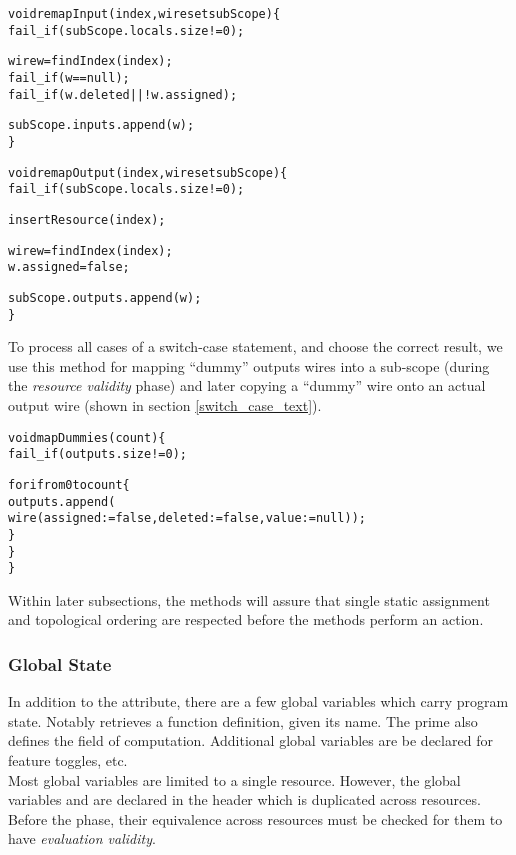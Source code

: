\begin{alltt}\ttSem
  void remapInput(index, wireset subScope) \{
    fail_if(subScope.locals.size != 0);

    wire w = findIndex(index);
    fail_if(w == null);
    fail_if(w.deleted || !w.assigned);
    
    subScope.inputs.append(w);
  \}

  void remapOutput(index, wireset subScope) \{
    fail_if(subScope.locals.size != 0);

    insertResource(index);

    wire w = findIndex(index);
    w.assigned = false;
    
    subScope.outputs.append(w);
  \}

\end{alltt}

To process all cases of a switch-case statement, and choose the correct result, we use this method for mapping ``dummy'' outputs wires into a sub-scope (during the \textit{resource validity} phase) and later copying a ``dummy'' wire onto an actual output wire (shown in section \ref{switch_case_text}).\\

\begin{alltt}\ttSem
  void mapDummies(count) \{
    fail_if(outputs.size != 0);

    for i from 0 to count \{
      outputs.append(
        wire(assigned := false, deleted := false, value := null));
    \}
  \}
\}
\end{alltt}

Within later subsections, the  methods will assure that single static assignment and topological ordering are respected before the  methods perform an action.
\\

\subsubsection{Global State}
In addition to the  attribute, there are a few global variables which carry program state.
Notably  retrieves a function definition, given its name.
The  prime also defines the field of computation.
Additional global variables are be declared for feature toggles, etc.\\

Most global variables are limited to a single resource.
However, the global variables  and  are declared in the header which is duplicated across resources.
Before the  phase, their equivalence across resources must be checked for them to have \textit{evaluation validity}.\\

